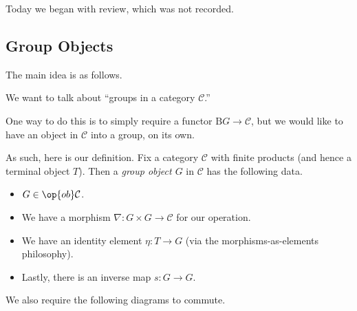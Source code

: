 
Today we began with review, which was not recorded.

\subsection{Group Objects}
The main idea is as follows.
\begin{idea}
	We want to talk about ``groups in a category $\mathcal C$.''
\end{idea}
One way to do this is to simply require a functor $\mathrm BG\to\mathcal C$, but we would like to have an object in $\mathcal C$ into a group, on its own.

As such, here is our definition. Fix a category $\mathcal C$ with finite products (and hence a terminal object $T$). Then a \textit{group object $G$} in $\mathcal C$ has the following data.
\begin{itemize}
	\item $G\in\op{ob}\mathcal C$.
	\item We have a morphism $\nabla:G\times G\to\mathcal C$ for our operation.
	\item We have an identity element $\eta:T\to G$ (via the morphisms-as-elements philosophy).
	\item Lastly, there is an inverse map $s:G\to G$.
\end{itemize}
We also require the following diagrams to commute.
